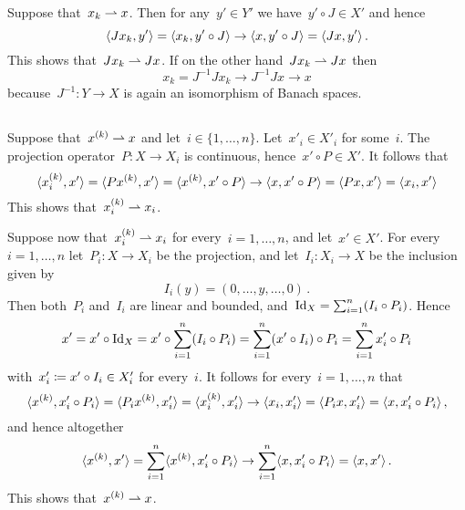 \section{}





\subsection{}

Suppose that~$x_k \rightharpoonup x$.
Then for any~$y' \in Y'$ we have~$y' \circ J \in X'$ and hence
\[
      \langle J x_k, y' \rangle
  =   \langle x_k, y' \circ J\rangle
  \to \langle x, y' \circ J\rangle
  =   \langle J x, y'\rangle \,.
\]
This shows that~$J x_k \rightharpoonup J x$.
If on the other hand~$J x_k \rightharpoonup J x$ then
\[
      x_k
  =   J^{-1} J x_k
  \to J^{-1} J x
  \to x
\]
because~$J^{-1} \colon Y \to X$ is again an isomorphism of Banach spaces.





\subsection{}

Suppose that~$x^{(k)} \rightharpoonup x$ and let~$i \in \{1, \dotsc, n\}$.
Let~$x'_i \in X'_i$ for some~$i$.
The projection operator~$P \colon X \to X_i$ is continuous, hence~$x' \circ P \in X'$.
It follows that
\[
      \langle x^{(k)}_i, x' \rangle
  =   \langle P x^{(k)}, x' \rangle
  =   \langle x^{(k)}, x' \circ P \rangle
  \to \langle x, x' \circ P \rangle
  =   \langle P x, x' \rangle
  =   \langle x_i, x' \rangle
\]
This shows that~$x^{(k)}_i \rightharpoonup x_i$.

Suppose now that~$x^{(k)}_i \rightharpoonup x_i$ for every~$i = 1, \dotsc, n$, and let~$x' \in X'$.
For every~$i = 1, \dotsc, n$ let~$P_i \colon X \to X_i$ be the projection, and let~$I_i \colon X_i \to X$ be the inclusion given by
\[
    I_i(y)
  = (0, \dotsc, y, \dotsc, 0) \,.
\]
Then both~$P_i$ and~$I_i$ are linear and bounded, and~$\operatorname{Id}_X = \sum_{i=1}^n (I_i \circ P_i)$.
Hence
\[
    x'
  = x' \circ \operatorname{Id}_X
  = x' \circ \sum_{i=1}^n (I_i \circ P_i)
  = \sum_{i=1}^n (x' \circ I_i) \circ P_i
  = \sum_{i=1}^n x'_i \circ P_i
\]
with~$x'_i \coloneqq x' \circ I_i \in X'_i$ for every~$i$.
It follows for every~$i = 1, \dotsc, n$ that
\[
      \langle x^{(k)}, x'_i \circ P_i\rangle
  =   \langle P_i x^{(k)}, x'_i\rangle
  =   \langle x^{(k)}_i, x'_i\rangle
  \to \langle x_i, x'_i \rangle
  =   \langle P_i x, x'_i \rangle
  =   \langle x, x'_i \circ P_i \rangle \,,
\]
and hence altogether
\[
      \langle x^{(k)}, x' \rangle
  =   \sum_{i=1}^n \langle x^{(k)}, x'_i \circ P_i \rangle
  \to \sum_{i=1}^n \langle x, x'_i \circ P_i \rangle
  =   \langle x, x' \rangle \,.
\]
This shows that~$x^{(k)} \rightharpoonup x$.





